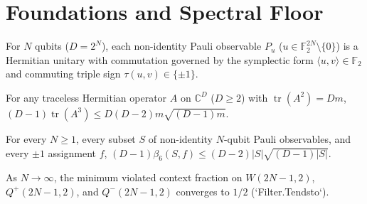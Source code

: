 
\section{Foundations and Spectral Floor}

\begin{definition}
\label{def:pauli}
\leanok
For $N$ qubits ($D = 2^N$), each non-identity Pauli observable $P_u$ ($u \in \mathbb{F}_2^{2N} \setminus \{0\}$)
is a Hermitian unitary with commutation governed by the symplectic form $\langle u, v \rangle \in \mathbb{F}_2$
and commuting triple sign $\tau(u,v) \in \{\pm 1\}$.
\end{definition}

\begin{lemma}
\label{lem:okumura}
\leanok
For any traceless Hermitian operator $A$ on $\mathbb{C}^D$ ($D \ge 2$) with $\operatorname{tr}(A^2) = D m$,
$(D-1)\operatorname{tr}(A^3) \le D(D-2)m\sqrt{(D-1)m}$.
\end{lemma}

\begin{theorem}
\label{thm:spectral-floor}
\leanok
For every $N \ge 1$, every subset $S$ of non-identity $N$-qubit Pauli observables, and every $\pm 1$ assignment $f$,
$(D-1)\beta_6(S,f) \le (D-2)|S|\sqrt{(D-1)|S|}$.
\end{theorem}

\begin{corollary}
\label{cor:asymptotic-half}
\leanok
As $N \to \infty$, the minimum violated context fraction on $W(2N-1,2)$, $Q^+(2N-1,2)$, and $Q^-(2N-1,2)$
converges to $1/2$ (`Filter.Tendsto`).
\end{corollary}

